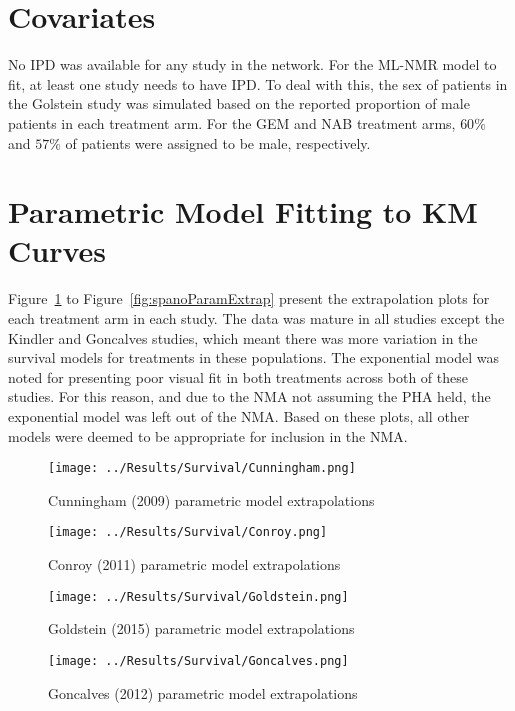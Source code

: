 \section{Covariates}
No IPD was available for any study in the network. For the ML-NMR model to fit, at least one study needs to have IPD. To deal with this, the sex of patients in the Golstein study was simulated based on the reported proportion of male patients in each treatment arm. For the GEM and NAB treatment arms, $60\%$ and $57\%$ of patients were assigned to be male, respectively. 

\section{Parametric Model Fitting to KM Curves}
Figure~\ref{fig:cunninghamParamExtrap} to Figure~\ref{fig:spanoParamExtrap} present the extrapolation plots for each treatment arm in each study. The data was mature in all studies except the Kindler and Goncalves studies, which meant there was more variation in the survival models for treatments in these populations. The exponential model was noted for presenting poor visual fit in both treatments across both of these studies. For this reason, and due to the NMA not assuming the PHA held, the exponential model was left out of the NMA. Based on these plots, all other models were deemed to be appropriate for inclusion in the NMA. \\

\begin{figure}[h]
    \centering
    \texttt{[image: ../Results/Survival/Cunningham.png]}
    \caption{Cunningham (2009) parametric model extrapolations}
    \label{fig:cunninghamParamExtrap}
\end{figure}

\begin{figure}[h]
    \centering
    \texttt{[image: ../Results/Survival/Conroy.png]}
    \caption{Conroy (2011) parametric model extrapolations}
    \label{fig:conroyParamExtrap}
\end{figure}

\begin{figure}[h]
    \centering
    \texttt{[image: ../Results/Survival/Goldstein.png]}
    \caption{Goldstein (2015) parametric model extrapolations}
    \label{fig:goldsteinParamExtrap}
\end{figure}

\begin{figure}[h]
    \centering
    \texttt{[image: ../Results/Survival/Goncalves.png]}
    \caption{Goncalves (2012) parametric model extrapolations}
    \label{fig:goncalvesParamExtrap}
\end{figure}

